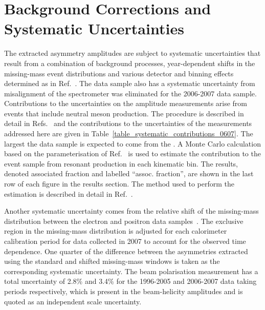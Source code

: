 \section{Background Corrections and Systematic Uncertainties}
The extracted asymmetry amplitudes are subject to systematic uncertainties that
result from a combination of background processes, year-dependent
shifts in the missing-mass event distributions and various detector and binning
effects determined as in Ref.~\cite{Air08,Air09}. The
 data sample also has a systematic uncertainty from misalignment of the spectrometer was eliminated for the 2006-2007 data sample. Contributions to the uncertainties on the amplitude measurements arise from  events that include neutral meson production. The procedure is described in detail in Refs.~\cite{Air08,Air09} and the contributions to the uncertainties of the measurements addressed here are given in Table~\ref{table_systematic_contributions_0607}. The largest  the data sample is expected to come from the . A Monte Carlo calculation based on the parameterisation of Ref.~\cite{Bra76} is used to estimate the contribution to the event sample from resonant production in each kinematic bin. The results, denoted associated fraction and labelled ``assoc. fraction'', are shown in the last row of each figure in the results section. The method used to perform the estimation is described in detail in
Ref.~\cite{Air08}.

Another  systematic uncertainty comes from the relative shift of the
missing-mass distribution between the electron and positron data
samples~\cite{Zei09,Bur10}. The exclusive region in the missing-mass
distribution is adjusted for each calorimeter calibration period for data
collected in 2007 to account for the observed time dependence. One
quarter of the difference between the asymmetries extracted using the standard
and shifted missing-mass windows is taken as the corresponding systematic
uncertainty. The beam polarisation measurement has a total uncertainty of 2.8\% and 3.4\% for the 1996-2005 and 2006-2007 data taking periods respectively,
which is present in the beam-helicity amplitudes and is quoted as an
independent scale uncertainty.

